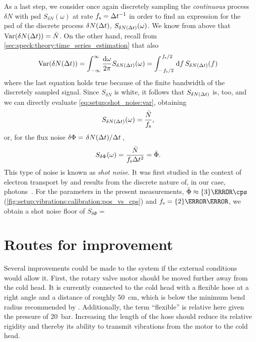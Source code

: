 As a last step, we consider once again discretely sampling the \emph{continuous} process $\delta N$ with \gls{psd} $S_{\delta N}(\omega)$ at rate $f_{\mathrm{s}}=\Delta t^{-1}$ in order to find an expression for the \gls{psd} of the discrete process $\delta N(\Delta t)$, $S_{\delta N(\Delta t)}(\omega)$.
We know from above that $\operatorname{Var}(\delta N(\Delta t)) = \bar{N}$.
On the other hand, recall from \cref{sec:speck:theory:time_series_estimation} that also
\begin{align}\label{eq:setup:shot_noise:var}
    \variance(\delta N(\dt)) = \intinf\ddf{\omega} S_{\delta N(\dt)}(\omega) = \int_{-\flatfrac{\fs}{2}}^{\flatfrac{\fs}{2}}\dd{f} S_{\delta N(\dt)}(f)
\end{align}
where the last equation holds true because of the finite bandwidth of the discretely sampled signal.
Since $S_{\delta N}$ is white, it follows that $S_{\delta N(\Delta t)}$ is, too, and we can directly evaluate \cref{eq:setup:shot_noise:var}, obtaining
\begin{equation}\label{eq:setup:shot_noise:psd}
    S_{\delta N(\Delta t)}(\omega) = \frac{\bar{N}}{f_{\mathrm{s}}},
\end{equation}
or, for the flux noise $\delta\Phi=\flatfrac{\delta N(\dt)}{\dt}$,
\begin{equation}\label{eq:setup:shot_noise:psd:flux}
    S_{\delta\Phi}(\omega) = \frac{\bar{N}}{f_{\mathrm{s}}\Delta t^2} = \bar{\Phi}.
\end{equation}
This type of noise is known as \emph{shot noise}.
It was first studied in the context of electron transport by \citet{Schottky1918} and results from the discrete nature of, in our case, photons~\cite{Blanter2000}.
For the parameters in the present measurements, $\bar{\Phi}\approx\qty{3}{\mega\cps}$ (\cf \cref{fig:setup:vibrations:calibration:pos_vs_cps}) and $\fs=\qty{2}{\kilo\hertz}$, we obtain a shot noise floor of $S_{\delta\Phi} = $

\section{Routes for improvement}\label{sec:setup:vibrations:outlook}
Several improvements could be made to the system if the external conditions would allow it.
First, the rotary valve motor should be moved further away from the cold head.
It is currently
connected to the cold head with a flexible hose at a right angle and a distance of roughly \qty{50}{\cm}, which is below the minimum bend radius recommended by \OI.
Additionally, the term \enquote{flexible} is relative here given the pressure of \qty{20}{\bar}.
Increasing the length of the hose should reduce its relative rigidity and thereby its ability to transmit vibrations from the motor to the cold head.

